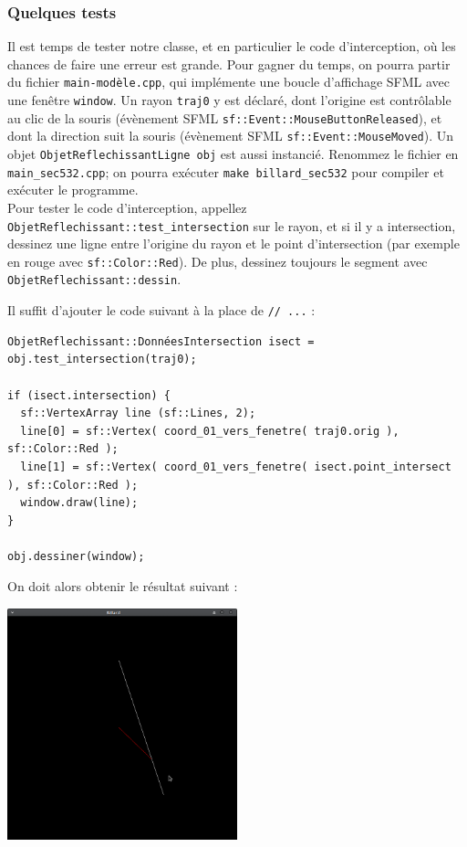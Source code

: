 \documentclass{book}
\newcommand{\inline}[1]{\texttt{#1}}
\def\filename{\texttt}
\begin{document}
\subsubsection{Quelques tests}

Il est temps de tester notre classe, et en particulier le code d'interception, où les chances de faire une erreur est grande. Pour gagner du temps, on pourra partir du fichier \filename{main-modèle.cpp}, qui implémente une boucle d'affichage SFML avec une fenêtre \inline{window}. Un rayon \inline{traj0} y est déclaré, dont l'origine est contrôlable au clic de la souris (évènement SFML \inline{sf::Event::MouseButtonReleased}), et dont la direction suit la souris (évènement SFML \inline{sf::Event::MouseMoved}). Un objet \inline{ObjetReflechissantLigne obj} est aussi instancié. Renommez le fichier en \filename{main\_sec532.cpp}; on pourra exécuter \texttt{make billard\_sec532} pour compiler et exécuter le programme.\\

Pour tester le code d'interception, appellez \inline{ObjetReflechissant::test_intersection} sur le rayon, et si il y a intersection, dessinez une ligne entre l'origine du rayon et le point d'intersection (par exemple en rouge avec \inline{sf::Color::Red}). De plus, dessinez toujours le segment avec \inline{ObjetReflechissant::dessin}.

\begin{correction}
Il suffit d'ajouter le code suivant à la place de \inline{// ...} :
\begin{verbatim}
ObjetReflechissant::DonnéesIntersection isect = obj.test_intersection(traj0);

if (isect.intersection) {
  sf::VertexArray line (sf::Lines, 2);
  line[0] = sf::Vertex( coord_01_vers_fenetre( traj0.orig ), sf::Color::Red );
  line[1] = sf::Vertex( coord_01_vers_fenetre( isect.point_intersect ), sf::Color::Red );
  window.draw(line);
}

obj.dessiner(window);
\end{verbatim}
\end{correction}

On doit alors obtenir le résultat suivant :
\begin{center}
\includegraphics[width=0.5\textwidth]{TD5bis/test-intersection.png}
\end{center}
\end{document}
